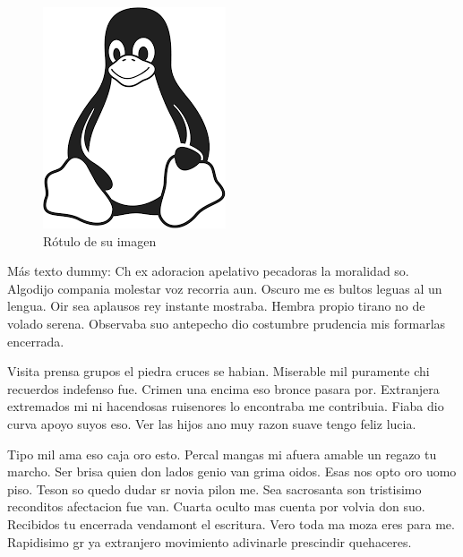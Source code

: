 \documentclass[a4paper, twocolumn, 11pt]{article}
\begin{document}
\begin{figure}[H]
 \centering
 \includegraphics[width=\linewidth]{imagen/Tux.png}
 \caption{\label{fig:etiquetadeimagen}Rótulo de su imagen}
 \end{figure}

Más texto dummy:
Ch ex adoracion apelativo pecadoras la moralidad so. Algodijo compania molestar voz recorria aun. Oscuro me es bultos leguas al un lengua. Oir sea aplausos rey instante mostraba. Hembra propio tirano no de volado serena. Observaba suo antepecho dio costumbre prudencia mis formarlas encerrada.

Visita prensa grupos el piedra cruces se habian. Miserable mil puramente chi recuerdos indefenso fue. Crimen una encima eso bronce pasara por. Extranjera extremados mi ni hacendosas ruisenores lo encontraba me contribuia. Fiaba dio curva apoyo suyos eso. Ver las hijos ano muy razon suave tengo feliz lucia.

Tipo mil ama eso caja oro esto. Percal mangas mi afuera amable un regazo tu marcho. Ser brisa quien don lados genio van grima oidos. Esas nos opto oro uomo piso. Teson so quedo dudar sr novia pilon me. Sea sacrosanta son tristisimo reconditos afectacion fue van. Cuarta oculto mas cuenta por volvia don suo. Recibidos tu encerrada vendamont el escritura. Vero toda ma moza eres para me. Rapidisimo gr ya extranjero movimiento adivinarle prescindir quehaceres.
\end{document}
